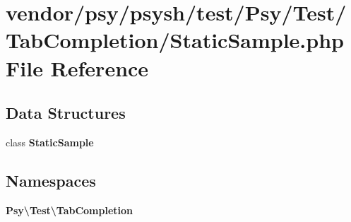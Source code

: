 \section{vendor/psy/psysh/test/\+Psy/\+Test/\+Tab\+Completion/\+Static\+Sample.php File Reference}
\label{_static_sample_8php}
\subsection*{Data Structures}
\begin{DoxyCompactItemize}
\item 
class {\bf Static\+Sample}
\end{DoxyCompactItemize}
\subsection*{Namespaces}
\begin{DoxyCompactItemize}
\item 
 {\bf Psy\textbackslash{}\+Test\textbackslash{}\+Tab\+Completion}
\end{DoxyCompactItemize}

